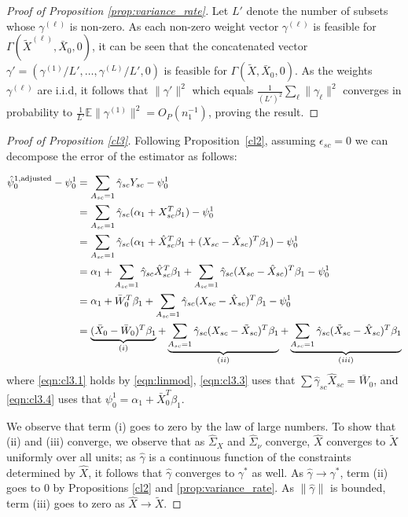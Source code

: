 \begin{proof}[Proof of Proposition \ref{prop:variance_rate}]
Let $L'$ denote the number of subsets whose $\gamma^{(\ell)}$ is non-zero. As each non-zero weight vector $\gamma^{(\ell)}$ is feasible for $\Gamma(\tilde{X}^{(\ell)}, \bar{X}_0, 0)$, it can be seen that the concatenated vector $\gamma' = (\gamma^{(1)}/L', \ldots, \gamma^{(L)}/L', 0)$ is feasible for $\Gamma(\tilde{X},\bar{X}_0,0)$. As the weights $\gamma^{(\ell)}$ are i.i.d, it follows that $\| \gamma'\|^2$ which equals $\frac{1}{(L')^2} \sum_\ell \|\gamma_\ell\|^2$  converges in probability to $\frac{1}{L'} \mathbb{E}\|\gamma^{(1)}\|^2 = O_P(n_1^{-1})$, proving the result.
\end{proof}


\begin{proof}[Proof of Proposition \ref{cl3}]
Following Proposition~\ref{cl2}, assuming $\epsilon_{sc}=0$ we can decompose the error of the estimator as follows:

\begin{align}
\nonumber    \hat{\psi}^{1,\textup{adjusted}}_0 - \psi_0^1 &= \sum_{A_{sc}=1} \hat{\gamma}_{sc} Y_{sc} - \psi_0^1 \\
    & = \sum_{A_{sc}=1} \hat{\gamma}_{sc} (\alpha_1 + X_{sc}^T \beta_1) - \psi_0^1 \label{eqn:cl3.1}\\
    \nonumber & = \sum_{A_{sc}=1} \hat{\gamma}_{sc} (\alpha_1 + \hat{X}_{sc}^T \beta_1 + (X_{sc} - \hat{X}_{sc})^T \beta_1 ) - \psi_0^1 \label{eqn:cl3.2}\\
    \nonumber & = \alpha_1 + \sum_{A_{sc}=1} \hat{\gamma}_{sc} \hat{X}_{sc}^T \beta_1 + \sum_{A_{sc}=1} \hat{\gamma}_{sc}(X_{sc} - \hat{X}_{sc})^T \beta_1  - \psi_0^1 \label{eqn:cl3.3}\\
    & = \alpha_1 + \bar{W}_0^T \beta_1 + \sum_{A_{sc}=1} \hat{\gamma}_{sc}(X_{sc} - \hat{X}_{sc})^T \beta_1  - \psi_0^1 \label{eqn:cl3.3}\\
    & = \underbrace{(\bar{X}_0 - \bar{W}_0)^T \beta_1}_{(i)} + \underbrace{\sum_{A_{sc}=1} \hat{\gamma}_{sc}(X_{sc} - \tilde{X}_{sc})^T \beta_1}_{(ii)} + \underbrace{\sum_{A_{sc}=1} \hat{\gamma}_{sc} (\tilde{X}_{sc} - \hat{X}_{sc})^T \beta_1}_{(iii)} \label{eqn:cl3.4}
\end{align}
where \eqref{eqn:cl3.1} holds by \eqref{eqn:linmod}, \eqref{eqn:cl3.3} uses that $\sum \hat{\gamma}_{sc} \hat{X}_{sc} = \bar{W}_0$, and \eqref{eqn:cl3.4} uses that $\psi_{0}^1 = \alpha_1 + \bar{X}_0^T \beta_1$.

We observe that term (i) goes to zero by the law of large numbers. To show that (ii) and (iii) converge, we observe that as  $\hat{\Sigma}_X$ and $\hat{\Sigma}_\nu$ converge, $\hat{X}$ converges to $\tilde{X}$ uniformly over all units; as $\hat{\gamma}$ is a continuous function of the constraints determined by $\hat{X}$, it follows that $\hat{\gamma}$ converges to $\gamma^*$ as well. As $\hat{\gamma} \to \gamma^*$, term (ii) goes to 0 by Propositions \ref{cl2} and \ref{prop:variance_rate}. As  $\|\hat{\gamma}\|$ is bounded, term (iii) goes to zero as $\hat{X} \to \tilde{X}$.



\end{proof}
